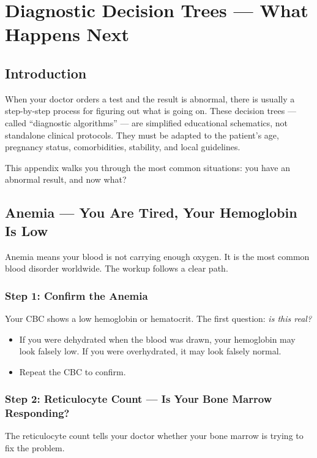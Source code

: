 \chapter{Diagnostic Decision Trees --- What Happens Next}
\label{app:algorithms}

\clearpage
\section{Introduction}

When your doctor orders a test and the result is abnormal, there is usually a step-by-step process for figuring out what is going on. These decision trees --- called ``diagnostic algorithms'' --- are simplified educational schematics, not standalone clinical protocols. They must be adapted to the patient's age, pregnancy status, comorbidities, stability, and local guidelines.

This appendix walks you through the most common situations: you have an abnormal result, and now what?

\clearpage
\section{Anemia --- You Are Tired, Your Hemoglobin Is Low}

Anemia means your blood is not carrying enough oxygen. It is the most common blood disorder worldwide. The workup follows a clear path.

\subsection{Step 1: Confirm the Anemia}

Your CBC shows a low hemoglobin or hematocrit. The first question: \emph{is this real?}

\begin{itemize}
    \item If you were dehydrated when the blood was drawn, your hemoglobin may look falsely low. If you were overhydrated, it may look falsely normal.
    \item Repeat the CBC to confirm.
\end{itemize}

\subsection{Step 2: Reticulocyte Count --- Is Your Bone Marrow Responding?}

The reticulocyte count tells your doctor whether your bone marrow is trying to fix the problem.

